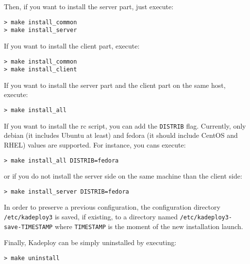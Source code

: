 \documentclass[a4wide,10pt,oneside]{book}
\begin{document}
\noindent Then, if you want to install the server part, just execute:
\begin{small}
\begin{verbatim}
> make install_common
> make install_server
\end{verbatim}
\end{small}

\noindent If you want to install the client part, execute:
\begin{small}
\begin{verbatim}
> make install_common
> make install_client
\end{verbatim}
\end{small}

\noindent If you want to install the server part and the client part on the same host, execute:
\begin{small}
\begin{verbatim}
> make install_all
\end{verbatim}
\end{small}

\noindent If you want to install the rc script, you can add the \texttt{DISTRIB} flag. Currently, only debian (it includes Ubuntu at least) and fedora (it should include CentOS and RHEL) values are supported. For instance, you cans execute:
\begin{small}
\begin{verbatim}
> make install_all DISTRIB=fedora
\end{verbatim}
\end{small}
or if you do not install the server side on the same machine than the client side:
\begin{small}
\begin{verbatim}
> make install_server DISTRIB=fedora
\end{verbatim}
\end{small}

\noindent In order to preserve a previous configuration, the configuration directory \texttt{/etc/kadeploy3} is saved, if existing, to a directory named \texttt{/etc/kadeploy3-save-TIMESTAMP} where \texttt{TIMESTAMP} is the moment of the new installation launch.

\noindent Finally, Kadeploy can be simply uninstalled by executing:
\begin{small}
\begin{verbatim}
> make uninstall
\end{verbatim}
\end{small}
\end{document}
